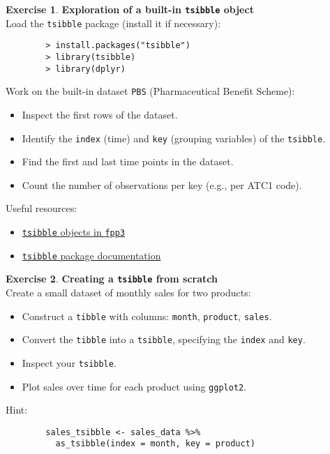 \documentclass[a4,a4paper,10pt,notitlepage,english]{article}
\theoremstyle{definition}
\newtheorem{exo}{Exercise}
\begin{document}
	
	\begin{center}
	\end{center}
	\bigskip

	
	
	
	
	
	
	
\begin{exo}
    \textbf{Exploration of a built-in \texttt{tsibble} object}\\

    Load the \texttt{tsibble} package (install it if necessary):
    \begin{verbatim}
        > install.packages("tsibble")
        > library(tsibble)
        > library(dplyr)
    \end{verbatim}

    Work on the built-in dataset \texttt{PBS} (Pharmaceutical Benefit Scheme):
    \begin{itemize}
        \item Inspect the first rows of the dataset.
        \item Identify the \texttt{index} (time) and \texttt{key} (grouping variables) of the \texttt{tsibble}.
        \item Find the first and last time points in the dataset.
        \item Count the number of observations per key (e.g., per ATC1 code).
    \end{itemize}
    \smallskip
    Useful resources:
    \begin{itemize}
        \item \href{https://otexts.com/fpp3/tsibbles.html}{\texttt{tsibble} objects in \texttt{fpp3}}
        \item \href{https://tsibble.tidyverts.org/}{\texttt{tsibble} package documentation}
    \end{itemize}
\end{exo}

\bigskip

\begin{exo}
    \textbf{Creating a \texttt{tsibble} from scratch}\\

    Create a small dataset of monthly sales for two products:
    \begin{itemize}
        \item Construct a \texttt{tibble} with columns: \texttt{month}, \texttt{product}, \texttt{sales}.
        \item Convert the \texttt{tibble} into a \texttt{tsibble}, specifying the \texttt{index} and \texttt{key}.
        \item Inspect your \texttt{tsibble}.
        \item Plot sales over time for each product using \texttt{ggplot2}.
    \end{itemize}
    \smallskip
    Hint:
    \begin{verbatim}
        sales_tsibble <- sales_data %>%
          as_tsibble(index = month, key = product)
    \end{verbatim}
\end{exo}
\end{document}
